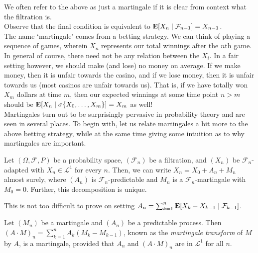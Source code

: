 		We often refer to the above as just a martingale if it is clear from context what the filtration is.\\
		Observe that the final condition is equivalent to $\textbf{E}[X_n\mid\mathcal{F}_{n-1}] = X_{n-1}$.\\
		The name `martingale' comes from a betting strategy. We can think of playing a sequence of games, wherein $X_n$ represents our total winnings after the $n$th game. In general of course, there need not be any relation between the $X_i$. In a fair setting however, we should make (and lose) no money on average. If we make money, then it is unfair towards the casino, and if we lose money, then it is unfair towards us (most casinos are unfair towards us). That is, if we have totally won $X_m$ dollars at time $m$, then our expected winnings at some time point $n>m$ should be $\textbf{E}[X_n \mid \sigma\{X_0,\ldots,X_m\}] = X_m$ as well!\\
		Martingales turn out to be surprisingly pervasive in probability theory and are seen in several places. To begin with, let us relate martingales a bit more to the above betting strategy, while at the same time giving some intuition as to why martingales are important.

		\begin{lemma}
			\label{doob decomposition}
			Let $(\Omega,\mathcal{F},P)$ be a probability space, $(\mathcal{F}_n)$ be a filtration, and $(X_n)$ be $\mathcal{F}_n$-adapted with $X_n\in\mathcal{L}^1$ for every $n$. Then, we can write $X_n = X_0 + A_n + M_n$ almost surely, where $(A_n)$ is $\mathcal{F}_n$-predictable and $M_n$ is a $\mathcal{F}_n$-martingale with $M_0=0$. Further, this decomposition is unique.
		\end{lemma}

		This is not too difficult to prove on setting $A_n = \sum_{k=1}^n \textbf{E}[X_k - X_{k-1} \mid \mathcal{F}_{k-1}]$.

		\begin{definition}
			Let $(M_n)$ be a martingale and $(A_n)$ be a predictable process. Then $(A\cdot M)_n = \sum_{k=1}^n A_k (M_k - M_{k-1})$, known as the \textit{martingale transform} of $M$ by $A$, is a martingale, provided that $A_n$ and $(A\cdot M)_n$ are in $\mathcal{L}^1$ for all $n$.
		\end{definition}

